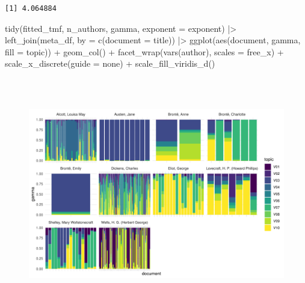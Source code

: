 \documentclass[
]{article}
\newenvironment{Shaded}{\begin{snugshade}}{\end{snugshade}}
\newcommand{\AttributeTok}[1]{\textcolor[rgb]{0.40,0.45,0.13}{#1}}
\newcommand{\FunctionTok}[1]{\textcolor[rgb]{0.28,0.35,0.67}{#1}}
\newcommand{\NormalTok}[1]{\textcolor[rgb]{0.00,0.23,0.31}{#1}}
\newcommand{\OtherTok}[1]{\textcolor[rgb]{0.00,0.23,0.31}{#1}}
\newcommand{\SpecialCharTok}[1]{\textcolor[rgb]{0.37,0.37,0.37}{#1}}
\newcommand{\StringTok}[1]{\textcolor[rgb]{0.13,0.47,0.30}{#1}}
\begin{document}
\begin{verbatim}
[1] 4.064884
\end{verbatim}

\begin{Shaded}
\begin{Highlighting}[]
\FunctionTok{tidy}\NormalTok{(fitted\_tmf, n\_authors, }\StringTok{\textquotesingle{}gamma\textquotesingle{}}\NormalTok{, }\AttributeTok{exponent =}\NormalTok{ exponent) }\SpecialCharTok{|\textgreater{}} 
    \FunctionTok{left\_join}\NormalTok{(meta\_df, }\AttributeTok{by =} \FunctionTok{c}\NormalTok{(}\StringTok{\textquotesingle{}document\textquotesingle{}} \OtherTok{=} \StringTok{\textquotesingle{}title\textquotesingle{}}\NormalTok{)) }\SpecialCharTok{|\textgreater{}} 
    \FunctionTok{ggplot}\NormalTok{(}\FunctionTok{aes}\NormalTok{(document, gamma, }\AttributeTok{fill =}\NormalTok{ topic)) }\SpecialCharTok{+}
    \FunctionTok{geom\_col}\NormalTok{() }\SpecialCharTok{+}
    \FunctionTok{facet\_wrap}\NormalTok{(}\FunctionTok{vars}\NormalTok{(author), }\AttributeTok{scales =} \StringTok{\textquotesingle{}free\_x\textquotesingle{}}\NormalTok{) }\SpecialCharTok{+}
    \FunctionTok{scale\_x\_discrete}\NormalTok{(}\AttributeTok{guide =} \StringTok{\textquotesingle{}none\textquotesingle{}}\NormalTok{) }\SpecialCharTok{+}
    \FunctionTok{scale\_fill\_viridis\_d}\NormalTok{()}
\end{Highlighting}
\end{Shaded}

\begin{figure}[H]

{\centering \includegraphics[width=6in,height=4in]{paper_files/figure-pdf/unnamed-chunk-49-1.pdf}

}

\end{figure}
\end{document}
